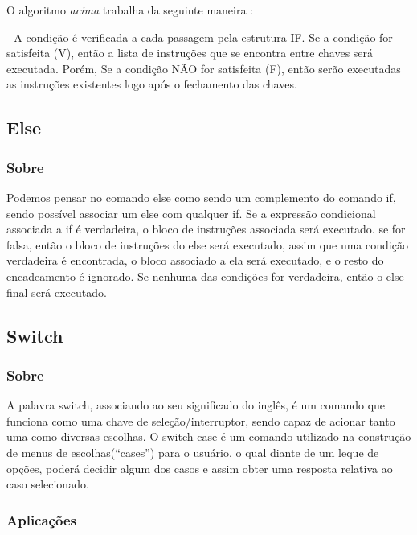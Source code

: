 \documentclass[a4paper,12pt]{article}  %
\begin{document}
  O algoritmo \textit{acima} trabalha da seguinte maneira :
 

  -  A condição é verificada a cada passagem pela estrutura IF. Se a condição for satisfeita (V), então a lista de instruções que se encontra entre chaves será executada. \newline
   Porém, Se a condição NÃO for satisfeita (F), então serão executadas as instruções existentes logo após o fechamento das chaves.
 
 \subsection{Else}
 \subsubsection{Sobre} %

   Podemos pensar no comando else como sendo um complemento do comando if, sendo possível associar um else com qualquer if. Se a expressão condicional associada a if é verdadeira, o bloco de instruções associada será executado. \newline 
se for falsa, então o bloco de instruções do else será executado, assim que uma condição verdadeira é encontrada, o bloco associado a ela será executado, e o resto do encadeamento é ignorado. \newline 
Se nenhuma das condições for verdadeira, então o else final será executado.

  
 \subsection{Switch}
 \subsubsection{Sobre} %
    
   A palavra switch, associando ao seu significado do inglês, é um comando que funciona como uma chave de seleção/interruptor, sendo capaz de acionar tanto uma como diversas escolhas. \newline
   O switch case é um comando utilizado na construção de menus de escolhas(“cases”) para o usuário, o qual diante de um leque de opções, poderá decidir algum dos casos e assim obter uma resposta relativa ao caso selecionado.
 

  \subsubsection{Aplicações}
\end{document}
